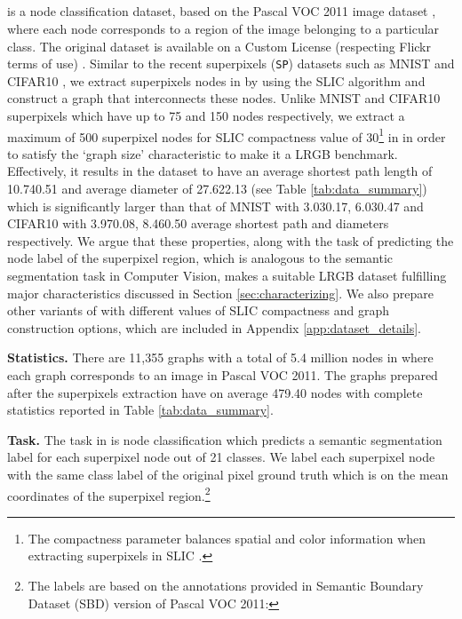 \documentclass{article}
\begin{document}
\subsection{\pascal}
\label{sec:pascalvoc}
\pascal is a node classification dataset, based on the Pascal VOC 2011 image dataset \cite{everingham2010pascal}, where each node corresponds to a region of the image belonging to a particular class. The original dataset is available on a Custom License (respecting Flickr terms of use) \cite{pascalvoc}. Similar to the recent superpixels (\texttt{SP}) datasets such as MNIST and CIFAR10 \cite{dwivedi2020benchmarking}, we extract superpixels nodes in \pascal by using the SLIC algorithm \cite{achanta2010slic} and construct a \rbgraph graph that interconnects these nodes.  
Unlike MNIST and CIFAR10 superpixels which have up to 75 and 150 nodes respectively, we extract a maximum of 500 superpixel nodes for SLIC compactness value of 30\footnote{The compactness parameter balances spatial and color information when extracting superpixels in SLIC \cite{achanta2010slic}.}
in \pascal in order to satisfy the `graph size’ characteristic to make it a LRGB benchmark. Effectively, it results in the \pascal dataset to have an average shortest path length of 10.740.51 and average diameter of 27.622.13 (see Table \ref{tab:data_summary}) which is significantly larger than that of MNIST with 3.030.17, 6.030.47 and CIFAR10 with 3.970.08, 8.460.50 average shortest path and diameters respectively. We argue that these properties, along with the task of predicting the node label of the superpixel region, which is analogous to the semantic segmentation task in Computer Vision, makes \pascal a suitable LRGB dataset fulfilling major characteristics discussed in Section \ref{sec:characterizing}. We also prepare other variants of \pascal with different values of SLIC compactness and graph construction options, which are included in Appendix \ref{app:dataset_details}.





\textbf{Statistics.} 
There are 11,355 graphs with a total of 5.4 million nodes in \pascal where each graph corresponds to an image in Pascal VOC 2011. The graphs prepared after the superpixels extraction have on average 479.40 nodes with complete statistics reported in Table \ref{tab:data_summary}.

\textbf{Task.} 
The 
task in \pascal is node classification which predicts a semantic segmentation label for each superpixel node out of 21 classes. We label each superpixel node with the same class label of the original pixel ground truth which is on the mean coordinates of the superpixel region.\footnote{The labels are based on the annotations provided in Semantic Boundary Dataset (SBD) version of Pascal VOC 2011: \fontsize{8.5pt}{8.5pt}}
\end{document}
